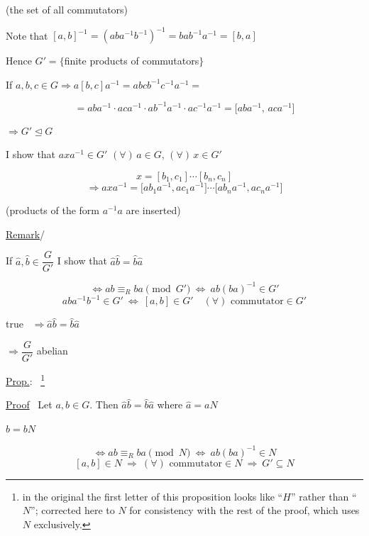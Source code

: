 \bigskip
\noindent{} \quad (the set of all commutators)

\bigskip
\noindent Note that $[a,b]^{-1} = (aba^{-1}b^{-1})^{-1} = bab^{-1}a^{-1} = [b,a]$

\noindent Hence $G' = \{$finite products of commutators$\}$

\bigskip
\noindent If $a,b,c\in G \Rightarrow a[b,c]a^{-1} = abcb^{-1}c^{-1}a^{-1} =$

\[
= aba^{-1}\cdot aca^{-1}\cdot ab^{-1}a^{-1}\cdot ac^{-1}a^{-1} = \big[aba^{-1},\,aca^{-1}\big]
\]

\noindent $\Rightarrow G'\trianglelefteq G$

\bigskip
\noindent I show that $axa^{-1}\in G'$ $(\forall)\,a\in G$, $(\forall)\,x\in G'$

\[
x=[b_1,c_1]\cdots[b_n,c_n]
\]
\[
\Rightarrow axa^{-1} = \big[ab_1a^{-1},ac_1a^{-1}\big]\cdots\big[ab_na^{-1},ac_na^{-1}\big]
\]

\noindent (products of the form $a^{-1}a$ are inserted)

\bigskip
\noindent\underline{Remark}/ \quad {}

\bigskip
\noindent If $\hat a,\hat b\in \dfrac{G}{G'}$ I show that $\hat a\hat b=\hat b\hat a$

\[
\Leftrightarrow ab\equiv_{R} ba \pmod{G'} \ \Leftrightarrow \ ab(ba)^{-1}\in G'
\]
\[
aba^{-1}b^{-1}\in G' \ \Leftrightarrow \ [a,b]\in G' \quad (\forall)\text{ commutator}\in G'
\]

\noindent true \ $\Rightarrow \hat a\hat b=\hat b\hat a$

\noindent $\Rightarrow \dfrac{G}{G'}$ abelian

\bigskip
\noindent\underline{Prop.}: \ \footnote{in the original the first letter of this proposition looks like ``$H$'' rather than ``$N$''; corrected here to $N$ for consistency with the rest of the proof, which uses $N$ exclusively.}

\bigskip
\noindent\underline{Proof} \ Let $a,b\in G$. Then $\hat a\hat b=\hat b\hat a$ where $\hat a=aN$

\noindent $\hat b=bN$

\[
\Leftrightarrow ab\equiv_{R} ba \pmod{N} \ \Leftrightarrow \ ab(ba)^{-1}\in N
\]
\[
[a,b]\in N \ \Rightarrow \ (\forall)\text{ commutator}\in N \ \Rightarrow \ G'\subseteq N
\]

